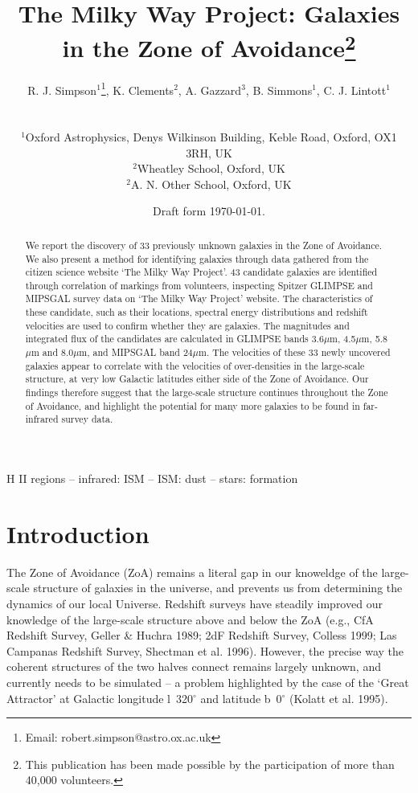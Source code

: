 \documentclass[times,usenatbib]{mn2e}
\title[Galaxies in the ZoA]{The Milky Way Project: Galaxies in the Zone of Avoidance\footnote{This publication has been made possible by the participation of more than 40,000 volunteers.}}
\author[Simpson et al.]
{\parbox{\textwidth}{R. J. Simpson$^{1}$\thanks{Email: robert.simpson@astro.ox.ac.uk},
K. Clements$^{2}$,
A. Gazzard$^{3}$,
B. Simmons$^{1}$,
C. J. Lintott$^{1}$}\vspace{0.8cm}\\
\parbox{\textwidth}{
$^{1}$Oxford Astrophysics, Denys Wilkinson Building, Keble Road, Oxford, OX1 3RH, UK \\
$^{2}$Wheatley School, Oxford, UK \\
$^{2}$A. N. Other School, Oxford, UK }}
\date{Draft form \today .}
\begin{document}
\label{firstpage}

\maketitle

\begin{abstract}

We report the discovery of 33 previously unknown galaxies in the Zone of Avoidance. We also present a method for identifying galaxies through data gathered from the citizen science website `The Milky Way Project'. 43 candidate galaxies are identified through correlation of markings from volunteers, inspecting Spitzer GLIMPSE and MIPSGAL survey data on `The Milky Way Project' website. The characteristics of these candidate, such as their locations, spectral energy distributions and redshift velocities are used to confirm whether they are galaxies. The magnitudes and integrated flux of the candidates are calculated in GLIMPSE bands 3.6$\mu$m, 4.5$\mu$m, 5.8$\mu$m and 8.0$\mu$m, and MIPSGAL band 24$\mu$m. The velocities of these 33 newly uncovered galaxies appear to correlate with the velocities of over-densities in the large-scale structure, at very low Galactic latitudes either side of the Zone of Avoidance. Our findings therefore suggest that the large-scale structure continues throughout the Zone of Avoidance, and highlight the potential for many more galaxies to be found in far-infrared survey data.

\end{abstract}
\begin{keywords}
H II regions -- infrared: ISM  -- ISM: dust -- stars: formation
\end{keywords}

\section{Introduction}

The Zone of Avoidance (ZoA) remains a literal gap in our knoweldge of the large-scale structure of galaxies in the universe, and prevents us from determining the dynamics of our local Universe. Redshift surveys have steadily improved our knowledge of the large-scale structure above and below the ZoA (e.g., CfA Redshift Survey, Geller \& Huchra 1989; 2dF Redshift Survey, Colless 1999; Las Campanas Redshift Survey, Shectman et al. 1996). However, the precise way the coherent structures of the two halves connect remains largely unknown, and currently needs to be simulated -- a problem highlighted by the case of the `Great Attractor' at Galactic longitude l~320$^{\circ}$ and latitude b~0$^{\circ}$ (Kolatt et al. 1995).
\end{document}
